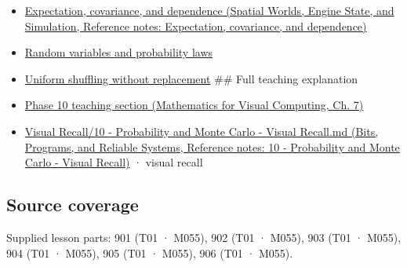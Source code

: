 \begin{itemize}
\item
  \href{../05-Spatial-Worlds-Engine-State-and-Simulation/main.pdf\#nameddest=appendix-54c383df9992}{Expectation, covariance, and dependence (Spatial Worlds, Engine State, and Simulation, Reference notes: Expectation, covariance, and dependence)}
\item
  \hyperref[appendix-4d0203f7944f]{Random variables and probability laws}
\item
  \hyperref[appendix-184fcc411663]{Uniform shuffling without replacement} \#\# Full teaching explanation
\item
  \href{../02-Mathematics-for-Visual-Computing/main.pdf\#nameddest=02-foundations-ii-ch023-a-probability-model-begins-with-possible-outcomes}{Phase 10 teaching section (Mathematics for Visual Computing, Ch. 7)}
\item
  \href{../01-Bits-Programs-and-Reliable-Systems/main.pdf\#nameddest=appendix-cb5af353ef77}{Visual Recall/10 - Probability and Monte Carlo - Visual Recall.md (Bits, Programs, and Reliable Systems, Reference notes: 10 - Probability and Monte Carlo - Visual Recall)} · visual recall
\end{itemize}

\subsection{Source coverage}\label{appendix-f1ef323f6ed7-source-coverage}

Supplied lesson parts: 901 (T01 · M055), 902 (T01 · M055), 903 (T01 · M055), 904 (T01 · M055), 905 (T01 · M055), 906 (T01 · M055).
